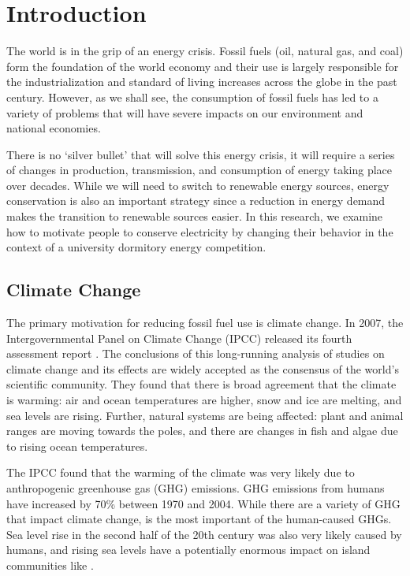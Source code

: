 \chapter{Introduction}

The world is in the grip of an energy crisis. Fossil fuels (oil, natural gas, and coal) form the foundation of the world economy and their use is largely responsible for the industrialization and standard of living increases across the globe in the past century. However, as we shall see, the consumption of fossil fuels has led to a variety of problems that will have severe impacts on our environment and national economies.

There is no `silver bullet' that will solve this energy crisis, it will require a series of changes in production, transmission, and consumption of energy taking place over decades. While we will need to switch to renewable energy sources, energy conservation is also an important strategy since a reduction in energy demand makes the transition to renewable sources easier. In this research, we examine how to motivate people to conserve electricity by changing their behavior in the context of a university dormitory energy competition.


\section{Climate Change}
\label{sec:motivation}

The primary motivation for reducing fossil fuel use is climate change. In 2007, the Intergovernmental Panel on Climate Change (IPCC) released its fourth assessment report \cite{IPCC-synthesis-report-2007}. The conclusions of this long-running analysis of studies on climate change and its effects are widely accepted as the consensus of the world's scientific community. They found that there is broad agreement that the climate is warming: air and ocean temperatures are higher, snow and ice are melting, and sea levels are rising. Further, natural systems are being affected: plant and animal ranges are moving towards the poles, and there are changes in fish and algae due to rising ocean temperatures.

The IPCC found that the warming of the climate was very likely due to anthropogenic greenhouse gas (GHG) emissions. GHG emissions from humans have increased by 70\% between 1970 and 2004. While there are a variety of GHG that impact climate change, \COtwo is the most important of the human-caused GHGs. Sea level rise in the second half of the 20th century was also very likely caused by humans, and rising sea levels have a potentially enormous impact on island communities like \Hawaii.

